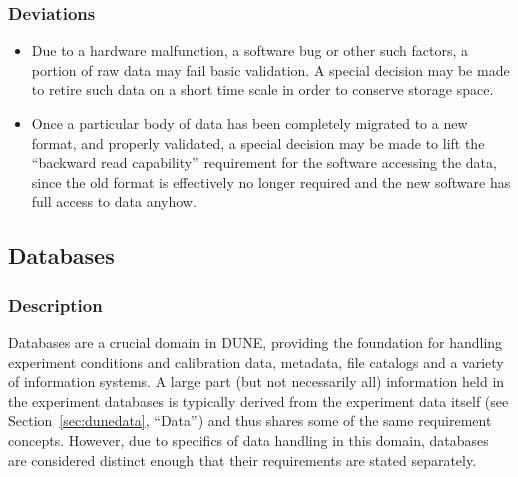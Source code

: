 \subsubsection{Deviations}
\begin{itemize}
\item Due to a hardware malfunction, a software bug or other such factors, a portion of raw data may fail basic validation. A special decision may be made to retire such data on a short time scale in order to conserve storage space.
\item Once a particular body of data has been completely migrated to a new format, and properly validated, a special decision may be made to lift the ``backward read capability'' requirement for the software accessing the data, since the old format is effectively no longer required and the new software has full access to data anyhow.
\end{itemize}

\subsection{Databases}
\label{sec:dunedb}
\subsubsection{Description}

Databases are a crucial domain in DUNE, providing the foundation for handling experiment conditions and calibration data, metadata, file catalogs and a variety of information systems.  A large part (but not necessarily all) information held in the experiment databases is typically derived from the experiment data itself (see  Section~\ref{sec:dunedata}, ``Data'') and thus shares some of the same requirement concepts.  However, due to specifics of data handling in this domain, databases are considered distinct enough that their requirements are stated separately.  

